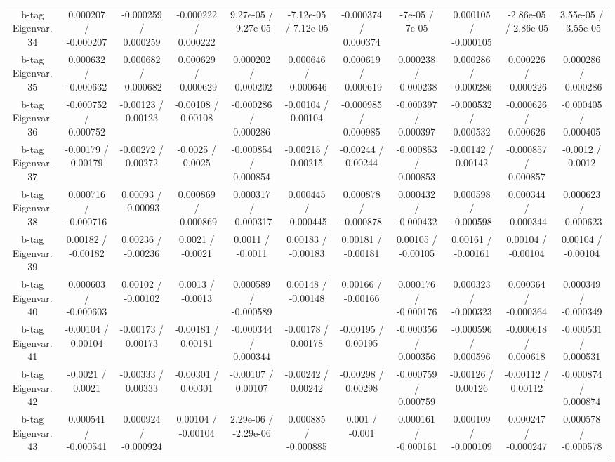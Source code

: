 \begin{table}[htbp]
\begin{center}
\begin{tabular}{|c|c|c|c|c|c|c|c|c|c|c|}
  b-tag Eigenvar. 34 & 0.000207 / -0.000207 & -0.000259 / 0.000259 & -0.000222 / 0.000222 & 9.27e-05 / -9.27e-05 & -7.12e-05 / 7.12e-05 & -0.000374 / 0.000374 & -7e-05 / 7e-05 & 0.000105 / -0.000105 & -2.86e-05 / 2.86e-05 & 3.55e-05 / -3.55e-05 \\ 
  b-tag Eigenvar. 35 & 0.000632 / -0.000632 & 0.000682 / -0.000682 & 0.000629 / -0.000629 & 0.000202 / -0.000202 & 0.000646 / -0.000646 & 0.000619 / -0.000619 & 0.000238 / -0.000238 & 0.000286 / -0.000286 & 0.000226 / -0.000226 & 0.000286 / -0.000286 \\ 
  b-tag Eigenvar. 36 & -0.000752 / 0.000752 & -0.00123 / 0.00123 & -0.00108 / 0.00108 & -0.000286 / 0.000286 & -0.00104 / 0.00104 & -0.000985 / 0.000985 & -0.000397 / 0.000397 & -0.000532 / 0.000532 & -0.000626 / 0.000626 & -0.000405 / 0.000405 \\ 
  b-tag Eigenvar. 37 & -0.00179 / 0.00179 & -0.00272 / 0.00272 & -0.0025 / 0.0025 & -0.000854 / 0.000854 & -0.00215 / 0.00215 & -0.00244 / 0.00244 & -0.000853 / 0.000853 & -0.00142 / 0.00142 & -0.000857 / 0.000857 & -0.0012 / 0.0012 \\ 
  b-tag Eigenvar. 38 & 0.000716 / -0.000716 & 0.00093 / -0.00093 & 0.000869 / -0.000869 & 0.000317 / -0.000317 & 0.000445 / -0.000445 & 0.000878 / -0.000878 & 0.000432 / -0.000432 & 0.000598 / -0.000598 & 0.000344 / -0.000344 & 0.000623 / -0.000623 \\ 
  b-tag Eigenvar. 39 & 0.00182 / -0.00182 & 0.00236 / -0.00236 & 0.0021 / -0.0021 & 0.0011 / -0.0011 & 0.00183 / -0.00183 & 0.00181 / -0.00181 & 0.00105 / -0.00105 & 0.00161 / -0.00161 & 0.00104 / -0.00104 & 0.00104 / -0.00104 \\ 
  b-tag Eigenvar. 40 & 0.000603 / -0.000603 & 0.00102 / -0.00102 & 0.0013 / -0.0013 & 0.000589 / -0.000589 & 0.00148 / -0.00148 & 0.00166 / -0.00166 & 0.000176 / -0.000176 & 0.000323 / -0.000323 & 0.000364 / -0.000364 & 0.000349 / -0.000349 \\ 
  b-tag Eigenvar. 41 & -0.00104 / 0.00104 & -0.00173 / 0.00173 & -0.00181 / 0.00181 & -0.000344 / 0.000344 & -0.00178 / 0.00178 & -0.00195 / 0.00195 & -0.000356 / 0.000356 & -0.000596 / 0.000596 & -0.000618 / 0.000618 & -0.000531 / 0.000531 \\ 
  b-tag Eigenvar. 42 & -0.0021 / 0.0021 & -0.00333 / 0.00333 & -0.00301 / 0.00301 & -0.00107 / 0.00107 & -0.00242 / 0.00242 & -0.00298 / 0.00298 & -0.000759 / 0.000759 & -0.00126 / 0.00126 & -0.00112 / 0.00112 & -0.000874 / 0.000874 \\ 
  b-tag Eigenvar. 43 & 0.000541 / -0.000541 & 0.000924 / -0.000924 & 0.00104 / -0.00104 & 2.29e-06 / -2.29e-06 & 0.000885 / -0.000885 & 0.001 / -0.001 & 0.000161 / -0.000161 & 0.000109 / -0.000109 & 0.000247 / -0.000247 & 0.000578 / -0.000578 \\ 

\end{tabular}
\end{center}
\end{table}
